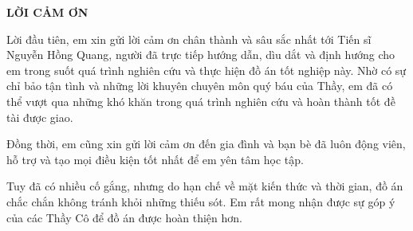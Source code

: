 \documentclass[../DoAn.tex]{subfiles}
\begin{document}
\begin{center}
    \Large{\textbf{LỜI CẢM ƠN}}\\
\end{center}
\vspace{1cm}
Lời đầu tiên, em xin gửi lời cảm ơn chân thành và sâu sắc nhất tới Tiến sĩ Nguyễn Hồng Quang, người đã trực tiếp hướng dẫn, dìu dắt và định hướng cho em trong suốt quá trình nghiên cứu và thực hiện đồ án tốt nghiệp này. Nhờ có sự chỉ bảo tận tình và những lời khuyên chuyên môn quý báu của Thầy, em đã có thể vượt qua những khó khăn trong quá trình nghiên cứu và hoàn thành tốt đề tài được giao.

Đồng thời, em cũng xin gửi lời cảm ơn đến gia đình và bạn bè đã luôn động viên, hỗ trợ và tạo mọi điều kiện tốt nhất để em yên tâm học tập.

Tuy đã có nhiều cố gắng, nhưng do hạn chế về mặt kiến thức và thời gian, đồ án chắc chắn không tránh khỏi những thiếu sót. Em rất mong nhận được sự góp ý của các Thầy Cô để đồ án được hoàn thiện hơn.
\end{document}
